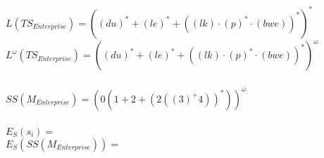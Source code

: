 \documentclass[a4paper,12pt]{scrartcl}
\title{\blatt}
\date{Gruppe 06}
\author{Sabrina Buczko 6663234, Julian Deinert 6535880, Rafael Heid 6704828}
\begin{document}
\maketitle
\newpage
\setcounter{section}{3}
\section{}
\setcounter{subsection}{2}
\subsection{}
\subsubsection{}
$L(TS_{Enterprise})= ((du)^*+(le)^*+((lk)\cdot (p)^*\cdot (bwe))^*)^*$\\
$L^\omega(TS_{Enterprise})=((du)^*+(le)^*+((lk)\cdot (p)^*\cdot (bwe))^*)^\omega$
\subsubsection{}
$SS(M_{Enterprise})=(0(1 + 2 + (2((3)^+ 4))^*))^\omega$\\

\subsubsection{}
$E_S(s_i)=$\\
$E_S(SS(M_{Enterprise}))=$
\subsubsection{}

\subsubsection{}
\subsection{}
\end{document}
